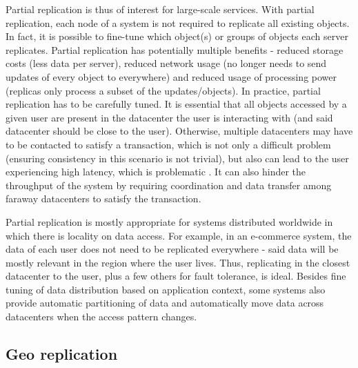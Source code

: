 Partial replication is thus of interest for large-scale services.
With partial replication, each node of a system is not required to replicate all existing objects.
In fact, it is possible to fine-tune which object(s) or groups of objects each server replicates.
Partial replication has potentially multiple benefits - reduced storage costs (less data per server), reduced network usage (no longer needs to send updates of every object to everywhere) and reduced usage of processing power (replicas only process a subset of the updates/objects).
In practice, partial replication has to be carefully tuned.
It is essential that all objects accessed by a given user are present in the datacenter the user is interacting with (and said datacenter should be close to the user).
Otherwise, multiple datacenters may have to be contacted to satisfy a transaction, which is not only a difficult problem (ensuring consistency in this scenario is not trivial), but also can lead to the user experiencing high latency, which is problematic \cite{???}.
It can also hinder the throughput of the system by requiring coordination and data transfer among faraway datacenters to satisfy the transaction.


Partial replication is mostly appropriate for systems distributed worldwide in which there is locality on data access.
For example, in an e-commerce system, the data of each user does not need to be replicated everywhere - said data will be mostly relevant in the region where the user lives.
Thus, replicating in the closest datacenter to the user, plus a few others for fault tolerance, is ideal.
Besides fine tuning of data distribution based on application context, some systems also provide automatic partitioning of data and automatically move data across datacenters when the access pattern changes.

\subsection{Geo replication}


